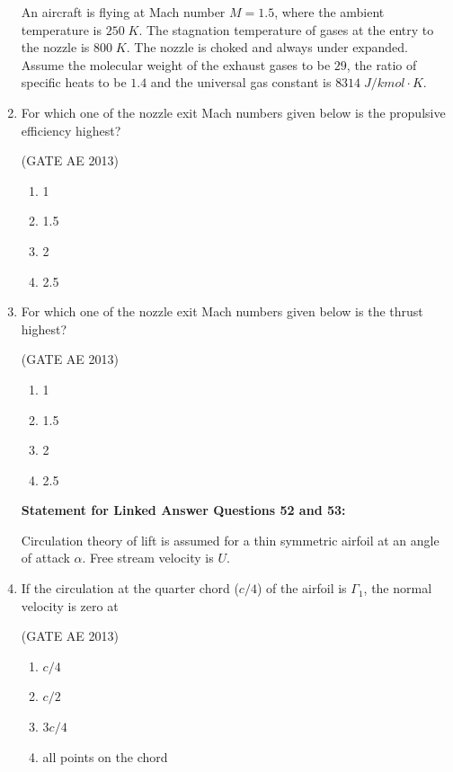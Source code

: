 \documentclass[journal,12pt,onecolumn]{IEEEtran}
\theoremstyle{remark}
\begin{document}
\begin{flushleft}
\begin{enumerate}
An aircraft is flying at Mach number $M = 1.5$, where the ambient temperature is $250 \;K$. The stagnation temperature of gases at the entry to the nozzle is $800 \;K$. The nozzle is choked and always under expanded. Assume the molecular weight of the exhaust gases to be $29$, the ratio of specific heats to be $1.4$ and the universal gas constant is $8314 \; J/kmol\cdot K$. 


\item For which one of the nozzle exit Mach numbers given below is the propulsive efficiency highest? 

\hfill(GATE AE 2013)
\begin{multicols}{2}
\begin{enumerate}
\item 1
\item 1.5
\item 2
\item 2.5
\end{enumerate}
\end{multicols}

\item For which one of the nozzle exit Mach numbers given below is the thrust highest? 

\hfill(GATE AE 2013)
\begin{multicols}{2}
\begin{enumerate}
\item 1
\item 1.5
\item 2
\item 2.5
\end{enumerate}
\end{multicols}



\textbf{Statement for Linked Answer Questions 52 and 53:}

Circulation theory of lift is assumed for a thin symmetric airfoil at an angle of attack $\alpha$. Free stream velocity is $U$.


\item If the circulation at the quarter chord ($c/4$) of the airfoil is $\Gamma_1$, the normal velocity is zero at

\hfill(GATE AE 2013)
\begin{multicols}{2}
\begin{enumerate}
\item $c/4$
\item $c/2$
\item $3c/4$
\item all points on the chord
\end{enumerate}
\end{multicols}


\end{enumerate}
\end{flushleft}
\end{document}
